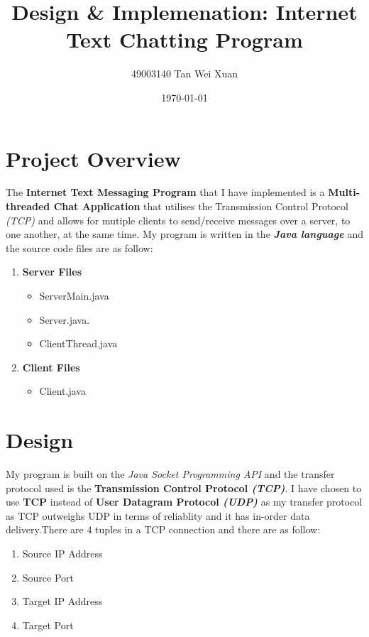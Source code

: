 \documentclass[a4paper,11pt]{article}
\begin{document}
\title{\vspace{-1.0cm}\textbf{Design \& Implemenation: \linebreak Internet Text Chatting Program}}
\author{49003140 Tan Wei Xuan}
\date{\today}
\maketitle

\section{Project Overview}
The\textbf{ Internet Text Messaging Program} that I have implemented is a \textbf{Multi-threaded Chat Application} that utilises the Transmission Control Protocol \textit{(TCP)} and allows for mutiple clients to send/receive messages over a server, to one another, at the same time. My program is written in the \textit{\textbf{Java language}} and the source code files are as follow:
\begin{enumerate}
	\item \textbf{Server Files}
\begin{itemize}
  	\item ServerMain.java
 	\item Server.java.
 	\item ClientThread.java
\end{itemize}
	\item \textbf{Client Files}
\begin{itemize}
  	\item Client.java
\end{itemize}
\end{enumerate}

\section{Design}
My program is built on the  \textit{Java Socket Programming API} and the transfer protocol used is the \textbf{Transmission Control Protocol \textit{(TCP)}}.
I have chosen to use \textbf{TCP} instead of \textbf{User Datagram Protocol \textit{(UDP)}} as my transfer protocol as TCP outweighs UDP in terms of reliablity and it has in-order data delivery.There are 4 tuples in a TCP connection and there are as follow:
\begin{enumerate}
  \item Source IP Address
  \item Source Port
  \item Target IP Address
  \item Target Port
\end{enumerate}
\end{document}
